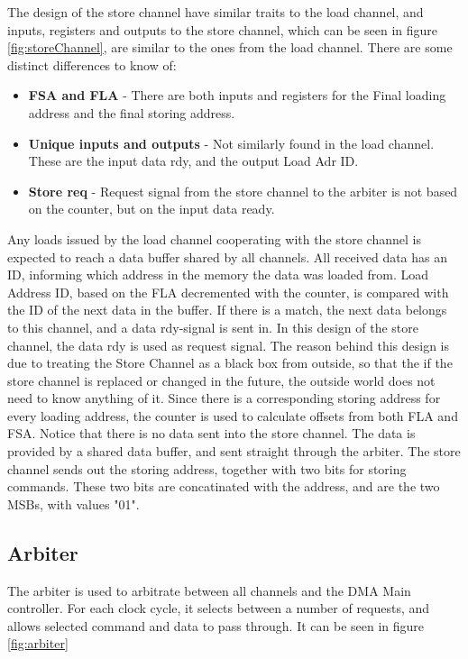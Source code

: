 The design of the store channel have similar traits to the load channel, and inputs, registers and outputs to the store channel, which can be seen in figure \ref{fig:storeChannel}, are similar to the ones from the load channel.
There are some distinct differences to know of:
\begin{itemize}
    \item \textbf{FSA and FLA} - There are both inputs and registers for the Final loading address and the final storing address.
    \item \textbf{Unique inputs and outputs} - Not similarly found in the load channel.
    These are the input data rdy, and the output Load Adr ID.
    \item \textbf{Store req} - Request signal from the store channel to the arbiter is not based on the counter, but on the input data ready.
\end{itemize}

Any loads issued by the load channel cooperating with the store channel is expected to reach a data buffer shared by all channels.
All received data has an ID, informing which address in the memory the data was loaded from.
Load Address ID, based on the FLA decremented with the counter, is compared with the ID of the next data in the buffer.
If there is a match, the next data belongs to this channel, and a data rdy-signal is sent in.
In this design of the store channel, the data rdy is used as request signal.
The reason behind this design is due to treating the Store Channel as a black box from outside, so that the if the store channel is replaced or changed in the future, the outside world does not need to know anything of it.
Since there is a corresponding storing address for every loading address, the counter is used to calculate offsets from both FLA and FSA.
Notice that there is no data sent into the store channel.
The data is provided by a shared data buffer, and sent straight through the arbiter.
The store channel sends out the storing address, together with two bits for storing commands.
These two bits are concatinated with the address, and are the two MSBs, with values "01".

\subsection{Arbiter}
The arbiter is used to arbitrate between all channels and the DMA Main controller.
For each clock cycle, it selects between a number of requests, and allows selected command and data to pass through.
It can be seen in figure \ref{fig:arbiter}

